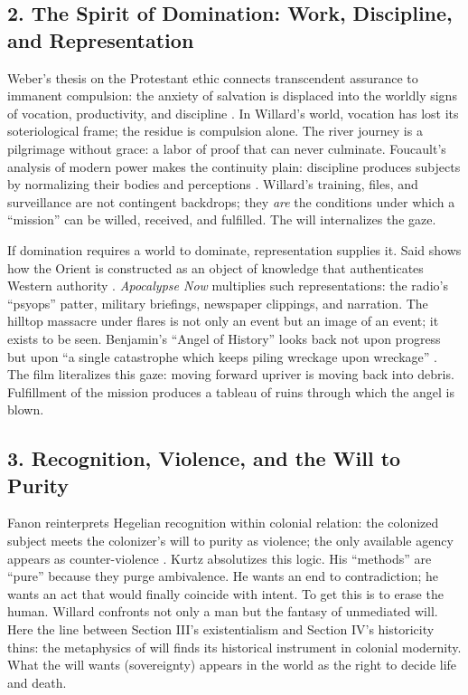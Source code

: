 \subsection*{2. The Spirit of Domination: Work, Discipline, and Representation}
\label{ssec:2-the-spirit-of-domination-work-discipline-and-representation}
Weber’s thesis on the Protestant ethic connects transcendent assurance to immanent compulsion: the anxiety of salvation is displaced into the worldly signs of vocation, productivity, and discipline \parencite{WeberProtestant2002}. In Willard’s world, vocation has lost its soteriological frame; the residue is compulsion alone. The river journey is a pilgrimage without grace: a labor of proof that can never culminate. Foucault’s analysis of modern power makes the continuity plain: discipline produces subjects by normalizing their bodies and perceptions \parencite{FoucaultDiscipline1995}. Willard’s training, files, and surveillance are not contingent backdrops; they \emph{are} the conditions under which a ``mission'' can be willed, received, and fulfilled. The will internalizes the gaze.

If domination requires a world to dominate, representation supplies it. Said shows how the Orient is constructed as an object of knowledge that authenticates Western authority \parencite{SaidOrientalism1978}. \textit{Apocalypse Now} multiplies such representations: the radio’s ``psyops'' patter, military briefings, newspaper clippings, and narration. The hilltop massacre under flares is not only an event but an image of an event; it exists to be seen. Benjamin’s ``Angel of History'' looks back not upon progress but upon ``a single catastrophe which keeps piling wreckage upon wreckage'' \parencite{BenjaminTheses1969}. The film literalizes this gaze: moving forward upriver is moving back into debris. Fulfillment of the mission produces a tableau of ruins through which the angel is blown.

\subsection*{3. Recognition, Violence, and the Will to Purity}
\label{ssec:3-recognition-violence-and-the-will-to-purity}
Fanon reinterprets Hegelian recognition within colonial relation: the colonized subject meets the colonizer’s will to purity as violence; the only available agency appears as counter-violence \parencite{FanonWretched2004}. Kurtz absolutizes this logic. His ``methods'' are ``pure'' because they purge ambivalence. He wants an end to contradiction; he wants an act that would finally coincide with intent. To get this is to erase the human. Willard confronts not only a man but the fantasy of unmediated will. Here the line between Section III’s existentialism and Section IV’s historicity thins: the metaphysics of will finds its historical instrument in colonial modernity. What the will wants (sovereignty) appears in the world as the right to decide life and death.

